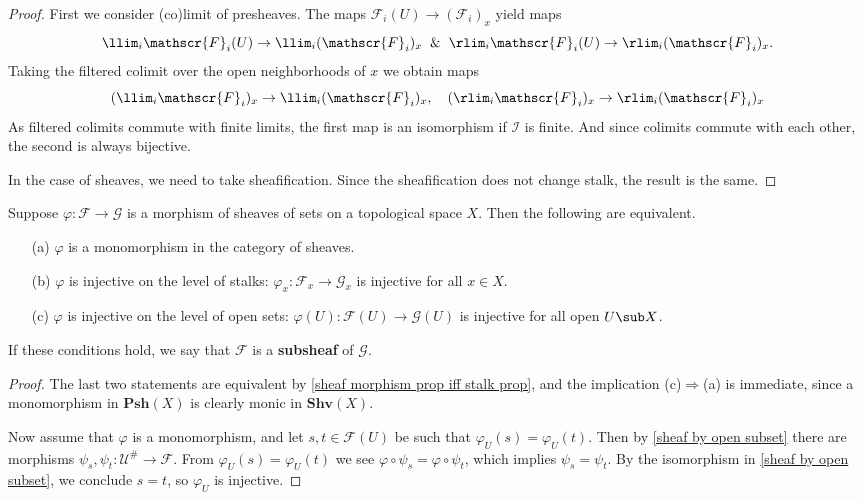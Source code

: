 \begin{proof}
First we consider (co)limit of presheaves. The maps $\mathscr{F}_i(U)\to(\mathscr{F}_i)_x$ yield maps \[\llim_i\mathscr{F}_i(U)\to\llim_i(\mathscr{F}_i)_x\And \rlim_i\mathscr{F}_i(U)\to\rlim_i(\mathscr{F}_i)_x.\] 
Taking the filtered colimit over the open neighborhoods of $x$ we obtain maps
\[(\llim_i\mathscr{F}_i)_x\to\llim_i(\mathscr{F}_i)_x,\quad (\rlim_i\mathscr{F}_i)_x\to\rlim_i(\mathscr{F}_i)_x\]
As filtered colimits commute with finite limits, the first map is an isomorphism if $\mathcal{I}$ is finite. And since colimits commute with each other, the second is always bijective.\par
In the case of sheaves, we need to take sheafification. Since the sheafification does not change stalk, the result is the same.
\end{proof}
\begin{proposition}\label{sheaf cat monomorphism iff}
Suppose $\varphi:\mathscr{F}\to\mathscr{G}$ is a morphism of sheaves of sets on a topological space $X$. Then the following are equivalent.
\begin{itemize}
\item[(a)] $\varphi$ is a monomorphism in the category of sheaves.
\item[(b)] $\varphi$ is injective on the level of stalks: $\varphi_x:\mathscr{F}_x\to\mathscr{G}_x$ is injective for all $x\in X$.
\item[(c)] $\varphi$ is injective on the level of open sets: $\varphi(U):\mathscr{F}(U)\to\mathscr{G}(U)$ is injective for all open $U\sub X$.
\end{itemize}
If these conditions hold, we say that $\mathscr{F}$ is a \textbf{subsheaf} of $\mathscr{G}$.
\end{proposition}
\begin{proof}
The last two statements are equivalent by \cref{sheaf morphism prop iff stalk prop}, and the implication (c)$\Rightarrow$(a) is immediate, since a monomorphism in $\mathbf{Psh}(X)$ is clearly monic in $\mathbf{Shv}(X)$.\par 
Now assume that $\varphi$ is a monomorphism, and let $s,t\in\mathscr{F}(U)$ be such that $\varphi_U(s)=\varphi_U(t)$. Then by \cref{sheaf by open subset} there are morphisms $\psi_s,\psi_t:\mathscr{U}^{\#}\to\mathscr{F}$. From $\varphi_U(s)=\varphi_U(t)$ we see $\varphi\circ\psi_s=\varphi\circ\psi_t$, which implies $\psi_s=\psi_t$. By the isomorphism in \cref{sheaf by open subset}, we conclude $s=t$, so $\varphi_U$ is injective.
\end{proof}
